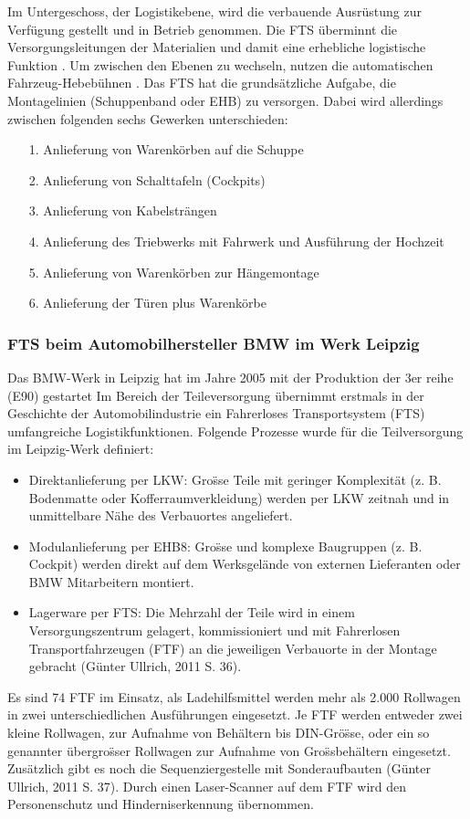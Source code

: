 Im Untergeschoss, der Logistikebene, wird die verbauende Ausr\"ustung zur Verf\"ugung gestellt und in Betrieb genommen. Die FTS \"uberminnt die Versorgungsleitungen der Materialien und damit eine erhebliche logistische Funktion . Um zwischen den Ebenen zu wechseln, nutzen die  automatischen Fahrzeug-Hebeb\"uhnen .
Das FTS hat die grunds\"atzliche Aufgabe, die Montagelinien (Schuppenband oder EHB) zu versorgen. Dabei wird allerdings zwischen folgenden sechs Gewerken unterschieden:
\begin{itemize}
\item[1.] Anlieferung von Warenk\"orben auf die Schuppe
\item[2.] Anlieferung von Schalttafeln (Cockpits)
\item[3.] Anlieferung von Kabelstr\"angen
\item[4.] Anlieferung des Triebwerks mit Fahrwerk und Ausf\"uhrung der Hochzeit
\item[5.] Anlieferung von Warenk\"orben zur H\"angemontage
\item[6.] Anlieferung der T\"uren plus Warenk\"orbe
\end{itemize}
\subsubsection{FTS beim Automobilhersteller BMW im Werk Leipzig}
Das BMW-Werk in Leipzig hat im Jahre 2005 mit der Produktion der 3er reihe (E90) gestartet
Im Bereich der Teileversorgung \"ubernimmt erstmals in der Geschichte der Automobilindustrie ein Fahrerloses Transportsystem (FTS) umfangreiche Logistikfunktionen. Folgende Prozesse wurde f\"ur die Teilversorgung im Leipzig-Werk definiert:

\begin{itemize}
\item Direktanlieferung per LKW: Gro\"sse Teile mit geringer Komplexit\"at (z. B. Bodenmatte oder Kofferraumverkleidung) werden per LKW zeitnah und in unmittelbare N\"ahe des Verbauortes angeliefert.
\item Modulanlieferung per EHB8: Gro\"sse und komplexe Baugruppen (z. B. Cockpit) werden direkt auf dem Werksgel\"ande von externen Lieferanten oder BMW Mitarbeitern montiert.
\item Lagerware per FTS: Die Mehrzahl der Teile wird in einem Versorgungszentrum gelagert, kommissioniert und mit Fahrerlosen Transportfahrzeugen (FTF) an die jeweiligen Verbauorte in der Montage gebracht (G\"unter Ullrich, 2011 S. 36).\end{itemize}
Es sind 74 FTF im Einsatz, als Ladehilfsmittel werden mehr als 2.000 Rollwagen in zwei unterschiedlichen Ausf\"uhrungen eingesetzt. Je FTF werden entweder zwei kleine Rollwagen, zur Aufnahme von Beh\"altern bis DIN-Gr\"o\"sse, oder ein so genannter \"ubergro\"sser Rollwagen zur Aufnahme von Gro\"ssbeh\"altern eingesetzt. Zus\"atzlich gibt es noch die Sequenziergestelle mit Sonderaufbauten (G\"unter Ullrich, 2011 S. 37). Durch einen Laser-Scanner auf dem FTF wird den Personenschutz und Hinderniserkennung \"ubernommen. 


